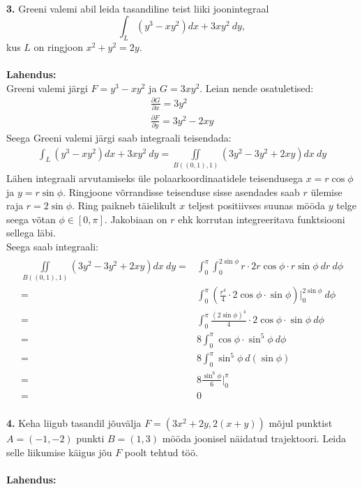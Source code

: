 \documentclass{article}
\begin{document}
\pagebreak\\
\textbf{3.} Greeni valemi abil leida tasandiline teist liiki joonintegraal $$\int_L(y^3-xy^2)dx+3xy^2\ dy,$$kus $L$ on ringjoon $x^2+y^2=2y$.\\\\
\textbf{Lahendus:}\\
Greeni valemi järgi $F=y^3-xy^2$ ja $G=3xy^2$. Leian nende osatuletised:
\begin{gather*}
\frac{\partial G}{\partial x}=3y^2\\
\frac{\partial F}{\partial y}=3y^2-2xy
\end{gather*}
Seega Greeni valemi järgi saab integraali teisendada:
\begin{gather*}
\int_L(y^3-xy^2)dx+3xy^2\ dy=\iint\limits_{B((0,1),1)}\left(3y^2-3y^2+2xy\right)dx\ dy
\end{gather*}
Lähen integraali arvutamiseks üle polaarkoordinaatidele teisendusega $x=r\cos\phi$ ja $y=r\sin\phi$. Ringjoone võrrandisse teisenduse sisse asendades saab $r$ ülemise raja $r=2\sin\phi$. Ring paikneb täielikult $x$ teljest positiivses suunas mööda $y$ telge seega võtan $\phi\in[0,\pi]$. Jakobiaan on $r$ ehk korrutan integreeritava funktsiooni sellega läbi.\\
Seega saab integraali:
\begin{gather*}
\begin{aligned}
\iint\limits_{B((0,1),1)}\left(3y^2-3y^2+2xy\right)dx\ dy=&\int_0^\pi\int_0^{2\sin\phi} r\cdot2r\cos\phi\cdot r\sin\phi\ dr\ d\phi\\
=&\int_0^\pi \left(\frac{r^4}{4}\cdot2\cos\phi\cdot \sin\phi\right)\bigg|_0^{2\sin\phi}\ d\phi\\
=&\int_0^\pi \frac{(2\sin\phi)^4}{4}\cdot2\cos\phi\cdot \sin\phi\ d\phi\\
=&8\int_0^\pi \cos\phi\cdot \sin^5\phi\ d\phi\\
=&8\int_0^\pi \sin^5\phi\ d(\sin\phi)\\
=&8 \frac{\sin^6\phi}6\Bigg|_0^\pi\\
=&0
\end{aligned}
\end{gather*}
\pagebreak\\
\textbf{4.} Keha liigub tasandil jõuvälja $F=(3x^2+2y, 2(x+y))$ mõjul punktist $A=(-1,-2)$ punkti $B=(1,3)$ mööda joonisel näidatud trajektoori. Leida selle liikumise käigus jõu $F$ poolt tehtud töö.\\\\
\textbf{Lahendus:}\\
\end{document}
